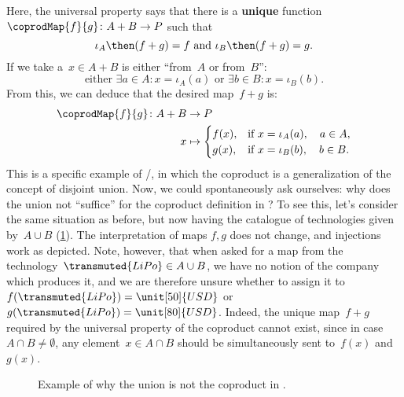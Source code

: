\begin{example}
Here, the universal property says that there is a \textbf{unique} function~$\coprodMap{f}{g}\colon A+B\to P$ such that
\begin{equation*}
    \iota_A\then (f+ g)=f \text{ and }\iota_B\then (f+ g)=g.
\end{equation*}
If we take a~$x\in A+B$ is either ``from~$A$ or from~$B$'':
\begin{equation*}
    \text{either } \exists a\in A:x=\iota_A(a) \text{ or }\exists b\in B:x=\iota_B(b).
\end{equation*}
From this, we can deduce that the desired map~$f+g$ is:
\begin{equation*}
\begin{aligned}
    \coprodMap{f}{g} \colon  A + B &\to P \\
    x &   \mapsto
    \begin{cases}
        f(x),& \text{if } x=\iota_A(a),\quad a \in A, \\
        g(x),& \text{if } x=\iota_B(b),\quad b \in B.
    \end{cases}
\end{aligned}
\end{equation*}
This is a specific example of \Set/\FinSet, in which the coproduct is a generalization of the concept of disjoint union. Now, we could spontaneously ask ourselves: why does the union not ``suffice'' for the coproduct definition in \Set? To see this, let's consider the same situation as before, but now having the catalogue of technologies given by~$A\cup B$ (\cref{fig:coprod_batteries_2}). The interpretation of maps $f,g$ does not change, and injections work as depicted. Note, however, that when asked for a map from the technology~$\transmuted{LiPo}\in A\cup B$, we have no notion of the company which produces it, and we are therefore unsure whether to assign it to~$f(\transmuted{LiPo})=\unit[50]{USD}$ or~$g(\transmuted{LiPo})=\unit[80]{USD}$. Indeed, the unique map~$f+g$ required by the universal property of the coproduct cannot exist, since in case~$A\cap B\neq \emptyset$, any element~$x\in A\cap B$ should be simultaneously sent to~$f(x)$ and~$g(x)$.

\begin{figure}[h!]
    \centering
    \caption{Example of why the union is not the coproduct in \Set.}
    \label{fig:coprod_batteries_2}
\end{figure}
\end{example}


